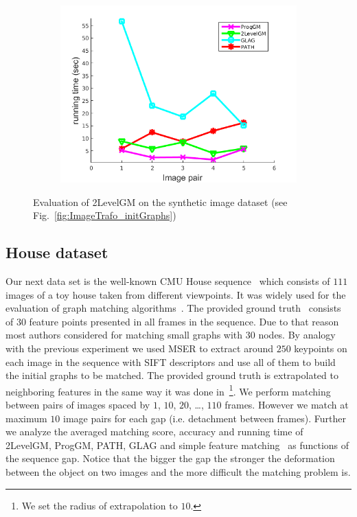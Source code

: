 \begin{figure}[h]
\begin{subfigure}[b]{0.32\textwidth}
			\includegraphics[scale=0.25]{"chapter3/fig/ImageTrafo/anchor_descr/using_cpd_afftrafo/performance/time1"}
		\end{subfigure} 	
	\caption[Evaluation of 2LevelGM on the synthetic image dataset (see Fig.~\ref{fig:ImageTrafo_initGraphs})]{Evaluation of 2LevelGM on the synthetic image dataset (see Fig.~\ref{fig:ImageTrafo_initGraphs})}
	 \label{fig:ImageTrafo}
\end{figure}

\subsection{House dataset}
Our next data set is the well-known CMU House sequence~\cite{CMUHouse} which consists of $111$ images of a toy house taken from different viewpoints. It was widely used for the evaluation of graph matching algorithms~\cite{Armiti2014,Hancock_ModalClusters,Cho2010_RRWM,Duchenne2011,FastPFP,Hancock_EM_SVD}. The provided ground truth~\cite{CMUHouse_GT} consists of $30$ feature points presented in all frames in the sequence. Due to that reason most authors considered for matching small graphs with $30$ nodes. By analogy with the previous experiment we used MSER to extract around $250$ keypoints on each image in the sequence with SIFT descriptors and use all of them to build the initial graphs to be matched. The provided ground truth is extrapolated to neighboring features in the same way it was done in~\cite{Cho2012_ProgressiveGM}\footnote{We set the radius of extrapolation to $10$.}. We perform matching between pairs of images spaced by $1$, $10$, $20$, \dots, $110$ frames. However we match at maximum $10$ image pairs for each gap (i.e. detachment between frames). Further we  analyze the averaged matching score, accuracy and running time of 2LevelGM, ProgGM, PATH, GLAG  and simple feature matching~\cite{Lowe2004} as functions of the sequence gap. Notice that the bigger the gap the stronger the deformation between the object on two images and the more difficult the matching problem is. 

